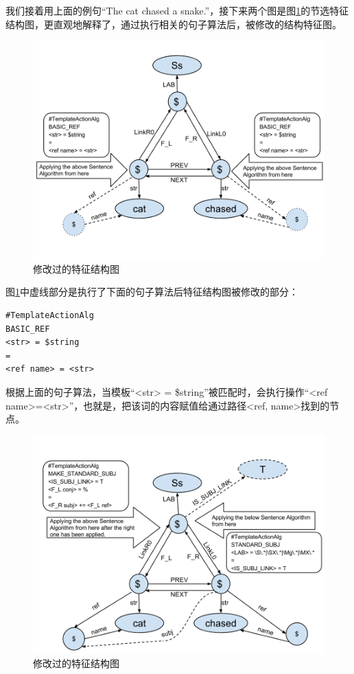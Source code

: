 我们接着用上面的例句“The cat chased a snake.”，接下来两个图是图\ref{fig:revisedFeatureStructure}的节选特征结构图，更直观地解释了，通过执行相关的句子算法后，被修改的结构特征图。  
\begin{figure}
\begin{centering}
\includegraphics[width=12cm]{figures/revisedFeatureStructure.png} 
\par\end{centering}

\caption{修改过的特征结构图\label{fig:revisedFeatureStructure}}
\end{figure}


图\ref{fig:revisedFeatureStructure}中虚线部分是执行了下面的句子算法后特征结构图被修改的部分：

\begin{verbatim}
#TemplateActionAlg
BASIC_REF
<str> = $string
=
<ref name> = <str>
\end{verbatim}

根据上面的句子算法，当模板“<str> = \$string”被匹配时，会执行操作“<ref name>=<str>”，也就是，把该词的内容赋值给通过路径<ref, name>找到的节点。

\begin{figure}
\begin{centering}
\includegraphics[width=12cm]{figures/revisedFeatureStructure_1.png} 
\par\end{centering}

\caption{修改过的特征结构图\label{fig:revisedFeatureStructure_1}}
\end{figure}

